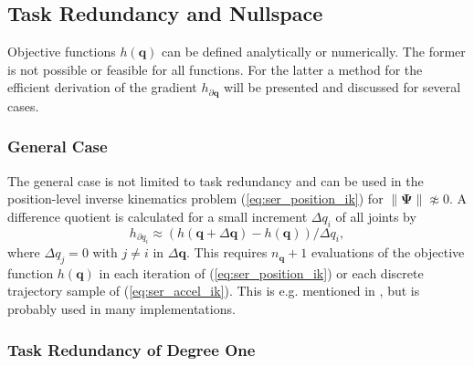 \documentclass[a4paper,twoside]{article}
\begin{document}
\subsection{Task Redundancy and Nullspace}
\label{sec:nullspace_serrob}

Objective functions $h(\bm{q})$ can be defined analytically or numerically.
The former is not possible or feasible for all functions.
For the latter a method for the efficient derivation of the gradient $h_{\partial \bm{q}}$ will be presented and discussed for several cases.

\subsubsection{General Case}
\label{sec:nullspace_serrob_general}

The general case is not limited to task redundancy and can be used in the position-level inverse kinematics problem (\ref{eq:ser_position_ik}) for $\lVert\bm{\Psi}\rVert \not\approx 0$.
A difference quotient is calculated for a small increment $\Delta q_i$ of all joints by
%
\begin{equation}
h_{\partial q_i} \approx (h(\bm{q}+\Delta \bm{q}) - h(\bm{q}))/\Delta q_i,
\label{eq:ser_diffquot_general}
\end{equation}
%
where $\Delta q_j = 0$ with $j \neq i$ in $\Delta \bm{q}$. %
This requires $n_{\bm{q}}{+}1$ evaluations of the objective function $h(\bm{q})$ in each iteration of (\ref{eq:ser_position_ik}) or each discrete trajectory sample of (\ref{eq:ser_accel_ik}).
This is e.g. mentioned in \cite{LilloChiAnt2019}, but is probably used in many implementations.

\subsubsection{Task Redundancy of Degree One}
\end{document}
